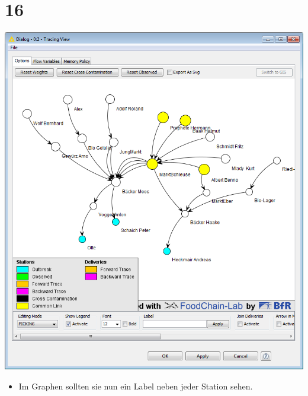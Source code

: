 \documentclass{beamer}
\begin{document}
\section{16}
\begin{frame}
	\begin{center}
  		\includegraphics[height=0.6\textheight]{16.png}
	\end{center}
	\begin{itemize}
		\item Im Graphen sollten sie nun ein Label neben jeder Station sehen.
	\end{itemize}
\end{frame}
\end{document}

